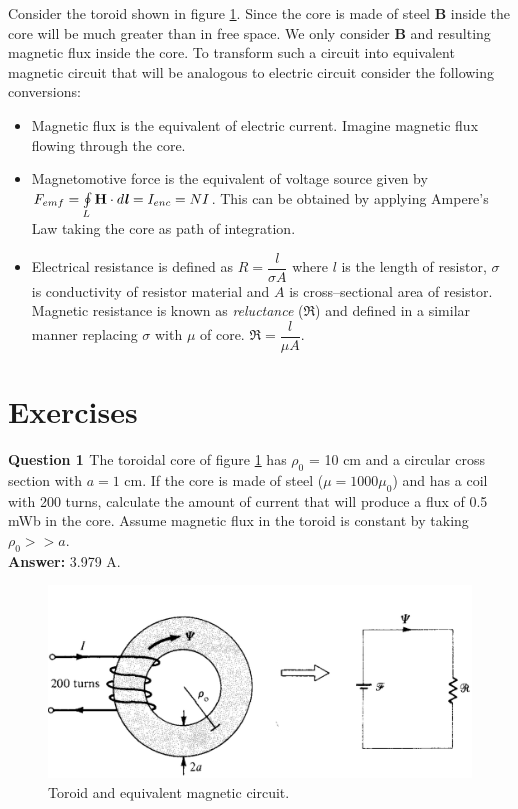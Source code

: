 \documentclass[12pt,a4paper]{article}
\begin{document}
Consider the toroid shown in figure \ref{Toroid-and-equivalent-circuit}. Since the core is made of steel \textbf{B} inside the core will be much greater than in free space. We only consider \textbf{B} and resulting magnetic flux inside the core. To transform such a circuit into equivalent magnetic circuit that will be analogous to electric circuit consider the following conversions:
\begin{itemize}
\item Magnetic flux is the equivalent of electric current. Imagine magnetic flux flowing through the core.
\item Magnetomotive force is the equivalent of voltage source given by $F_{emf}=\oint\limits_{L} \textbf{H}\cdot d\textbf{\textit{l}}=I_{enc}=NI$. This can be obtained by applying Ampere's Law taking the core as path of integration.
\item Electrical resistance is defined as $R=\dfrac{l}{\sigma A}$ where $l$ is the length of resistor, $\sigma$ is conductivity of resistor material and $A$ is cross--sectional area of resistor. Magnetic resistance is known as \textit{reluctance} ($\Re$) and defined in a similar manner replacing $\sigma$ with $\mu$ of core. $\Re=\dfrac{l}{\mu A}$.
\end{itemize}
\section{Exercises}
\noindent\textbf{Question 1 \cite[Example 8.14, page 350]{Sadiku}} The toroidal core of figure \ref{Toroid-and-equivalent-circuit} has $\rho_0$ = 10 cm and a circular cross section with $a=1$ cm. If the core is made of steel ($\mu = 1000\mu_0$) and has a coil with 200 turns, calculate the amount of current that will produce a flux of 0.5 mWb in the core. Assume magnetic flux in the toroid is constant by taking $\rho_0>>a$.\\
\textbf{Answer:} 3.979 A.
\begin{figure}[H]
\centering
\includegraphics[scale=0.4]{Figure8-26S.png}
\caption{Toroid and equivalent magnetic circuit.}
\label{Toroid-and-equivalent-circuit}
\end{figure}


\end{document}
